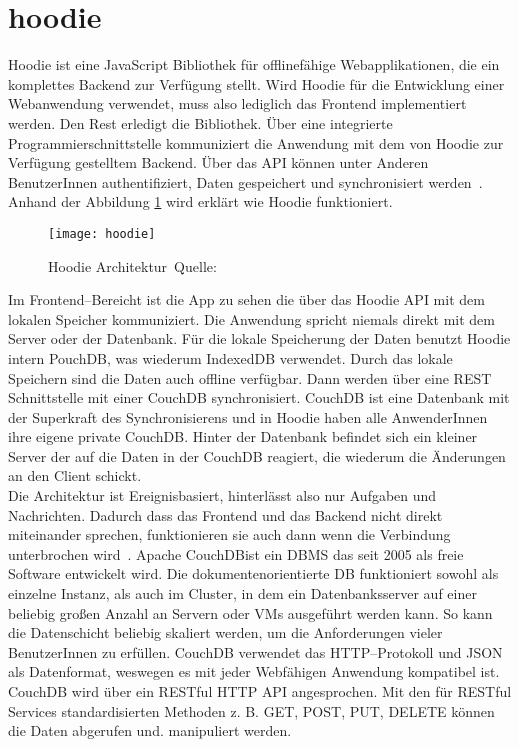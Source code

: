 \section{hoodie}
Hoodie ist eine JavaScript Bibliothek für offlinefähige Webapplikationen, die ein komplettes Backend zur Verfügung stellt. Wird Hoodie für die Entwicklung einer Webanwendung verwendet, muss also lediglich das Frontend implementiert werden. Den Rest erledigt die Bibliothek. Über eine integrierte Programmierschnittstelle kommuniziert die Anwendung mit dem von Hoodie zur Verfügung gestelltem Backend. Über das \gls{API} können unter Anderen BenutzerInnen authentifiziert, Daten gespeichert und synchronisiert werden~\cite{hoodie}.\\
Anhand der Abbildung \ref{fig:hoodie} wird erklärt wie Hoodie funktioniert.
\begin{figure}[H]
  \centering
  \texttt{[image: hoodie]}
  \grayRule
  \caption[Hoodie Architektur]{Hoodie Architektur~Quelle:~\cite{hoodie-how}}
  \label{fig:hoodie}
\end{figure}
Im Frontend--Bereicht ist die App zu sehen die über das Hoodie \gls{API} mit dem lokalen Speicher kommuniziert. Die Anwendung spricht niemals direkt mit dem Server oder der Datenbank. Für die lokale Speicherung der Daten benutzt Hoodie intern PouchDB, was wiederum IndexedDB verwendet. Durch das lokale Speichern sind die Daten auch offline verfügbar. Dann werden über eine \gls{REST} Schnittstelle mit einer CouchDB synchronisiert. CouchDB ist eine Datenbank mit der Superkraft des Synchronisierens und in Hoodie haben alle AnwenderInnen ihre eigene private CouchDB. Hinter der Datenbank befindet sich ein kleiner Server der auf die Daten in der CouchDB reagiert, die wiederum die Änderungen an den Client schickt.\\
Die Architektur ist Ereignisbasiert, hinterlässt also nur Aufgaben und Nachrichten. Dadurch dass das Frontend und das Backend nicht direkt miteinander sprechen, funktionieren sie auch dann wenn die Verbindung unterbrochen wird~\cite{hoodie-how}.
%
%
Apache CouchDB\tm ist ein \gls{DBMS} das seit 2005 als freie Software entwickelt wird. Die dokumentenorientierte \gls{DB} funktioniert sowohl als einzelne Instanz, als auch im Cluster, in dem ein Datenbanksserver auf einer beliebig großen Anzahl an Servern oder \glspl{VM} ausgeführt werden kann. So kann die Datenschicht beliebig skaliert werden, um die Anforderungen vieler BenutzerInnen zu erfüllen. CouchDB verwendet das \gls{HTTP}--Protokoll und \gls{JSON} als Datenformat, weswegen es mit jeder Webfähigen Anwendung kompatibel ist. CouchDB wird über ein \gls{REST}ful \gls{HTTP} \gls{API} angesprochen. Mit den für \gls{REST}ful Services standardisierten Methoden z. B. GET, POST, PUT, DELETE können die Daten abgerufen und. manipuliert werden.\\
